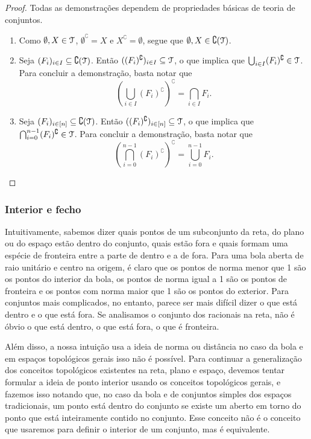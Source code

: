 \begin{proof} Todas as demonstrações dependem de propriedades básicas de teoria de conjuntos.
	\begin{enumerate}
	\item Como $\emptyset,X \in \mathcal{T}$, $\emptyset^\complement = X$ e $X^\complement = \emptyset$, segue que $\emptyset,X \in \complement (\mathcal{T})$.
	
	\item  Seja $(F_i)_{i \in I} \subseteq \complement (\mathcal{T})$. Então $((F_i)^\complement)_{i \in I} \subseteq \mathcal{T}$, o que implica que $\bigcup_{i \in I} (F_i)^\complement \in \mathcal{T}$. Para concluir a demonstração, basta notar que
	\begin{equation*}
	\left( \bigcup_{i \in I} (F_i)^\complement \right)^\complement = \bigcap_{i \in I} F_i.
	\end{equation*}
	
	\item Seja $(F_i)_{i \in [n]} \subseteq \complement (\mathcal{T})$. Então $((F_i)^\complement)_{i \in [n]} \subseteq \mathcal{T}$, o que implica que $\bigcap_{i=0}^{n-1} (F_i)^\complement \in \mathcal{T}$. Para concluir a demonstração, basta notar que
	\begin{equation*}
	\left( \bigcap_{i=0}^{n-1} (F_i)^\complement \right)^\complement = \bigcup_{i=0}^{n-1} F_i.
	\end{equation*}
\qedhere
	\end{enumerate}
\end{proof}

\subsubsection{Interior e fecho}

	Intuitivamente, sabemos dizer quais pontos de um subconjunto da reta, do plano ou do espaço estão dentro do conjunto, quais estão fora e quais formam uma espécie de fronteira entre a parte de dentro e a de fora. Para uma bola aberta de raio unitário e centro na origem, é claro que os pontos de norma menor que 1 são os pontos do interior da bola, os pontos de norma igual a 1 são os pontos de fronteira e os pontos com norma maior que 1 são os pontos do exterior. Para conjuntos mais complicados, no entanto, parece ser mais difícil dizer o que está dentro e o que está fora. Se analisamos o conjunto dos racionais na reta, não é óbvio o que está dentro, o que está fora, o que é fronteira.
	
	Além disso, a nossa intuição usa a ideia de norma ou distância no caso da bola e em espaços topológicos gerais isso não é possível. Para continuar a generalização dos conceitos topológicos existentes na reta, plano e espaço, devemos tentar formular a ideia de ponto interior usando os conceitos topológicos gerais, e fazemos isso notando que, no caso da bola e de conjuntos simples dos espaços tradicionais, um ponto está dentro do conjunto se existe um aberto em torno do ponto que está inteiramente contido no conjunto. Esse conceito não é o conceito que usaremos para definir o interior de um conjunto, mas é equivalente.
	

